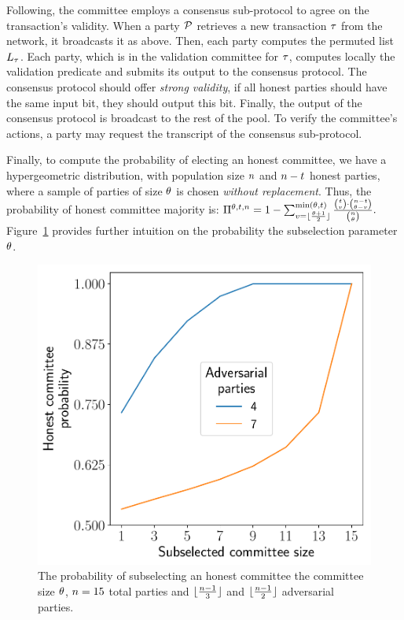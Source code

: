 Following, the committee employs a consensus sub-protocol to agree on
the transaction's validity. When a party $\mathcal{P}$ retrieves a new transaction $\tau$
from the network, it broadcasts it as above. Then, each party computes the
permuted list $L_{\tau}$. Each party, which is in the validation
committee for $\tau$, computes locally the validation predicate and submits its
output to the consensus protocol. The consensus protocol should offer
\emph{strong validity}, \ie if all honest parties should have the same input
bit, they should output this bit. Finally, the output of the consensus protocol
is broadcast to the rest of the pool. To verify the committee's actions, a
party may request the transcript of the consensus sub-protocol.

Finally, to compute the probability of electing an honest committee,
we have a hypergeometric distribution, with population size
$n$ and $n - t$ honest parties, where
a sample of parties of size $\theta$ is chosen \emph{without
replacement}. Thus, the probability of honest committee majority is:
$\Pi^{\theta, t, n} = 1 - \sum_{v = \lfloor \frac{\theta + 1}{2} \rfloor}^{\min (\theta, t)} \frac{ {t \choose v} \cdot {{n- t} \choose {\theta- v}} }{ {n \choose \theta} }.$
Figure~\ref{fig:subselection} provides further intuition on the probability
\wrt the subselection parameter $\theta$.

\begin{figure}
    \begin{center}
        \includegraphics[width=0.5\columnwidth]{figures/collective-pools/probability_subselection.pdf}
    \end{center}
    \caption{
        The probability of subselecting an honest committee \wrt the committee
        size $\theta$, $n = 15$ total parties and
        $\lfloor \frac{n - 1}{3} \rfloor$ and $\lfloor
        \frac{n - 1}{2} \rfloor$ adversarial parties.
    }
    \label{fig:subselection}
\end{figure}


